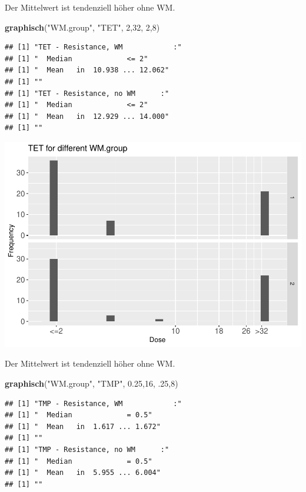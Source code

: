\documentclass[
]{article}
\newenvironment{Shaded}{\begin{snugshade}}{\end{snugshade}}
\newcommand{\DecValTok}[1]{\textcolor[rgb]{0.00,0.00,0.81}{#1}}
\newcommand{\FloatTok}[1]{\textcolor[rgb]{0.00,0.00,0.81}{#1}}
\newcommand{\KeywordTok}[1]{\textcolor[rgb]{0.13,0.29,0.53}{\textbf{#1}}}
\newcommand{\NormalTok}[1]{#1}
\newcommand{\StringTok}[1]{\textcolor[rgb]{0.31,0.60,0.02}{#1}}
\begin{document}
Der Mittelwert ist tendenziell höher ohne WM.

\begin{Shaded}
\begin{Highlighting}[]
  \KeywordTok{graphisch}\NormalTok{(}\StringTok{"WM.group"}\NormalTok{, }\StringTok{"TET"}\NormalTok{, }\DecValTok{2}\NormalTok{,}\DecValTok{32}\NormalTok{, }\DecValTok{2}\NormalTok{,}\DecValTok{8}\NormalTok{) }
\end{Highlighting}
\end{Shaded}

\begin{verbatim}
## [1] "TET - Resistance, WM            :"
## [1] "  Median             <= 2"
## [1] "  Mean   in  10.938 ... 12.062"
## [1] ""
## [1] "TET - Resistance, no WM      :"
## [1] "  Median             <= 2"
## [1] "  Mean   in  12.929 ... 14.000"
## [1] ""
\end{verbatim}

\includegraphics{Verteilungen_files/figure-latex/unnamed-chunk-41-1.pdf}

Der Mittelwert ist tendenziell höher ohne WM.

\begin{Shaded}
\begin{Highlighting}[]
  \KeywordTok{graphisch}\NormalTok{(}\StringTok{"WM.group"}\NormalTok{, }\StringTok{"TMP"}\NormalTok{, }\FloatTok{0.25}\NormalTok{,}\DecValTok{16}\NormalTok{, }\FloatTok{.25}\NormalTok{,}\DecValTok{8}\NormalTok{) }
\end{Highlighting}
\end{Shaded}

\begin{verbatim}
## [1] "TMP - Resistance, WM            :"
## [1] "  Median             = 0.5"
## [1] "  Mean   in  1.617 ... 1.672"
## [1] ""
## [1] "TMP - Resistance, no WM      :"
## [1] "  Median             = 0.5"
## [1] "  Mean   in  5.955 ... 6.004"
## [1] ""
\end{verbatim}
\end{document}
